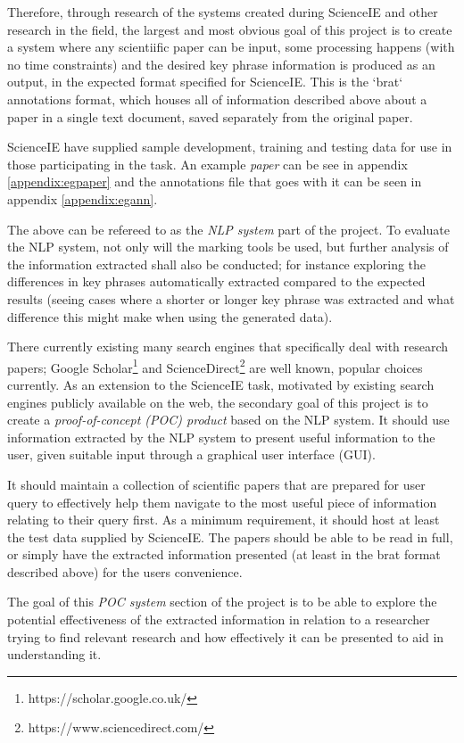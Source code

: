 Therefore, through research of the systems created during ScienceIE and other research in the field, the largest and most obvious goal of this project is to create a system where any scientiific paper can be input, some processing happens (with no time constraints) and the desired key phrase information is produced as an output, in the expected format specified for ScienceIE. This is the `brat` annotations format, which houses all of information described above about a paper in a single text document, saved separately from the original paper. 

ScienceIE have supplied sample development, training and testing data for use in those participating in the task. An example \textit{paper} can be see in appendix \ref{appendix:egpaper} and the annotations file that goes with it can be seen in appendix \ref{appendix:egann}.

The above can be refereed to as the \textit{NLP system} part of the project. To evaluate the NLP system, not only will the marking tools be used, but further analysis of the information extracted shall also be conducted; for instance exploring the differences in key phrases automatically extracted compared to the expected results (seeing cases where a shorter or longer key phrase was extracted and what difference this might make when using the generated data).

There currently existing many search engines that specifically deal with research papers; Google Scholar\footnote{https://scholar.google.co.uk/} and ScienceDirect\footnote{https://www.sciencedirect.com/} are well known, popular choices currently. As an extension to the ScienceIE task, motivated by existing search engines publicly available on the web, the secondary goal of this project is to create a \textit{proof-of-concept (POC) product} based on the NLP system. It should use information extracted by the NLP system to present useful information to the user, given suitable input through a graphical user interface (GUI). 

It should maintain a collection of scientific papers that are prepared for user query to effectively help them navigate to the most useful piece of information relating to their query first. As a minimum requirement, it should host at least the test data supplied by ScienceIE. The papers should be able to be read in full, or simply have the extracted information presented (at least in the brat format described above) for the users convenience.

The goal of this \textit{POC system} section of the project is to be able to explore the potential effectiveness of the extracted information in relation to a researcher trying to find relevant research and how effectively it can be presented to aid in understanding it. 

